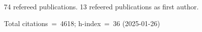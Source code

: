 74 refereed publications. 13 refeered publications as first author.

Total citations~=~4618; h-index~=~36 (2025-01-26)